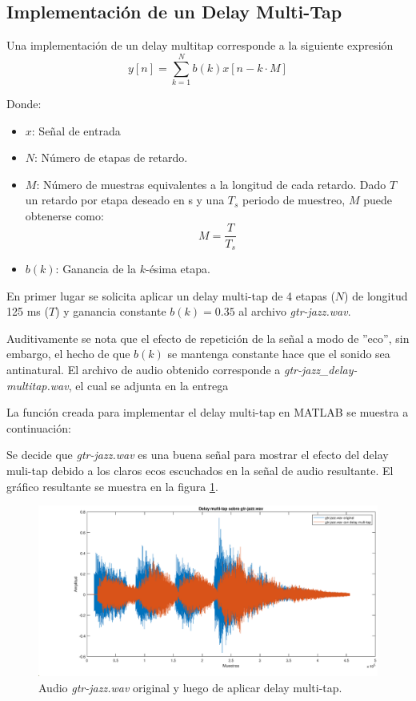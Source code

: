\subsection{Implementación de un Delay Multi-Tap}

Una implementación de un delay multitap corresponde a la siguiente expresión
\begin{equation}
    y[n] = \sum_{k=1}^N b(k)x[n-k\cdot M]
\end{equation}

Donde:
\begin{itemize}
    \item $x$: Señal de entrada
    \item $N$: Número de etapas de retardo.
    \item $M$: Número de muestras equivalentes a la longitud de cada retardo. Dado $T$ un retardo por etapa deseado en s y una $T_s$ periodo de muestreo, $M$ puede obtenerse como:
    $$M = \dfrac{T}{T_s}$$
    \item $b(k)$: Ganancia de la $k$-ésima etapa.
\end{itemize}

En primer lugar se solicita aplicar un delay multi-tap de 4 etapas ($N$) de longitud 125 ms ($T$) y ganancia constante $b(k) = 0.35$ al archivo \textit{gtr-jazz.wav}. 

Auditivamente se nota que el efecto de repetición de la señal a modo de ''eco'', sin embargo, el hecho de que $b(k)$ se mantenga constante hace que el sonido sea antinatural. El archivo de audio obtenido corresponde a \textit{gtr-jazz\_delay-multitap.wav}, el cual se adjunta en la entrega

La función creada para implementar el delay multi-tap en MATLAB se muestra a continuación:



Se decide que \textit{gtr-jazz.wav} es una buena señal para mostrar el efecto del delay muli-tap debido a los claros ecos escuchados en la señal de audio resultante. El gráfico resultante se muestra en la figura \ref{fig:p221}. 

\begin{figure}[H]
    \centering
    \includegraphics[width = .8\linewidth]{Figuras/p221_comparacion-delay.eps}
    \caption{Audio \textit{gtr-jazz.wav} original y luego de aplicar delay multi-tap.}
    \label{fig:p221}
\end{figure}

